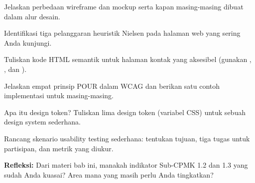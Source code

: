 \documentclass[../main.tex]{subfiles}
\begin{document}
\begin{latihan}
  \item Jelaskan perbedaan wireframe dan mockup serta kapan masing-masing dibuat dalam alur desain.
  \item Identifikasi tiga pelanggaran heuristik Nielsen pada halaman web yang sering Anda kunjungi.
  \item Tuliskan kode HTML semantik untuk halaman kontak yang aksesibel (gunakan , , dan ).
  \item Jelaskan empat prinsip POUR dalam WCAG dan berikan satu contoh implementasi untuk masing-masing.
  \item Apa itu design token? Tuliskan lima design token (variabel CSS) untuk sebuah design system sederhana.
  \item Rancang skenario usability testing sederhana: tentukan tujuan, tiga tugas untuk partisipan, dan metrik yang diukur.
  \item \textbf{Refleksi:} Dari materi bab ini, manakah indikator Sub-CPMK 1.2 dan 1.3 yang sudah Anda kuasai? Area mana yang masih perlu Anda tingkatkan?
\end{latihan}
\end{document}

